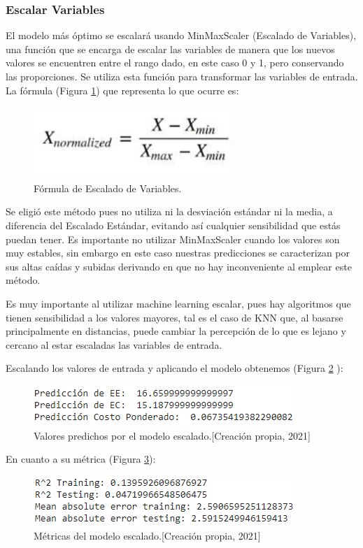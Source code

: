 \documentclass{article}
\begin{document}
\subsubsection{Escalar Variables}

El modelo más óptimo se escalará usando MinMaxScaler (Escalado de Variables), una función que se encarga de escalar las variables de manera que los nuevos valores se encuentren entre el rango dado, en este caso 0 y 1, pero conservando las proporciones. Se utiliza esta función para transformar las variables de entrada. La fórmula (Figura  \ref{fig:EscaladoVariables})  que representa lo que ocurre es:

\begin{figure}[!h]
    \centering
    \includegraphics[scale=.7]{F4/F4-im38.PNG}
    \caption{Fórmula de Escalado de Variables.\cite{EscaladoCita1}}
    \label{fig:EscaladoVariables}
\end{figure}

Se eligió este método pues no utiliza ni la desviación estándar ni la media, a diferencia del Escalado Estándar, evitando así cualquier sensibilidad que estás puedan tener. Es importante no utilizar MinMaxScaler cuando los valores son muy estables, sin embargo en este caso nuestras predicciones se caracterizan por sus altas caídas y subidas derivando en que no hay inconveniente al emplear este método.\cite{EscaladoCita1}

Es muy importante al utilizar machine learning escalar, pues hay algoritmos que tienen sensibilidad a los valores mayores, tal es el caso de KNN que, al basarse principalmente en distancias, puede cambiar la percepción de lo que es lejano y cercano al estar escaladas las variables de entrada. \cite{EscaladoCita2}

Escalando los valores de entrada y aplicando el modelo obtenemos (Figura \ref{fig:PrediccionesEscalado} ):
\begin{figure}[!h]
    \centering
    \includegraphics[scale=.7]{F4/F4-im39.PNG}
    \caption{Valores predichos por el modelo escalado.[Creación propia, 2021]}
    \label{fig:PrediccionesEscalado}
\end{figure}
En cuanto a su métrica (Figura \ref{fig:PrediccionesEscalado2}):
\begin{figure}[!h]
    \centering
    \includegraphics[scale=.7]{F4/F4-im40.PNG}
    \caption{Métricas del modelo escalado.[Creación propia, 2021]}
    \label{fig:PrediccionesEscalado2}
\end{figure}
\pagebreak
\end{document}
